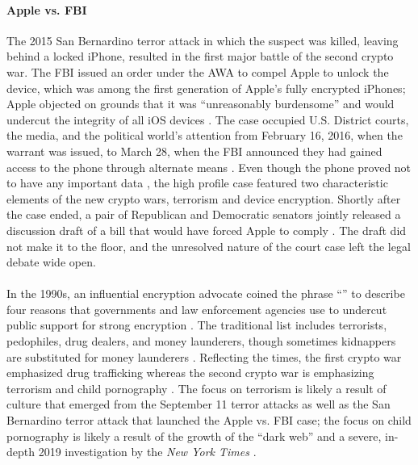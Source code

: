 \paragraph*{Apple vs. FBI} The 2015 San Bernardino terror attack in which the suspect was killed, leaving behind a
locked iPhone, resulted in the first major battle of the second crypto war. The \ac{FBI} issued an order under the
\acrlong{AWA} to compel Apple to unlock the device, which was among the first generation of Apple's fully encrypted
iPhones; Apple objected on grounds that it was ``unreasonably burdensome'' and would undercut the integrity of all iOS
devices \cite{schulze_clipper_2017}. The case occupied U.S. District courts, the media, and the political world's
attention from February 16, 2016, when the warrant was issued, to March 28, when the \ac{FBI} announced they had gained
access to the phone through alternate means \cite{novet_2016}. Even though the phone proved not to have any important
data \cite{schulze_clipper_2017}, the high profile case featured two characteristic elements of the new crypto wars,
terrorism and device encryption. Shortly after the case ended, a pair of Republican and Democratic senators jointly
released a discussion draft of a bill that would have forced Apple to comply \cite{burr_2016}. The draft did not make it
to the floor, and the unresolved nature of the court case left the legal debate wide open.

\paragraph*{} In the 1990s, an influential encryption advocate coined the phrase ``''
to describe four reasons that governments and law enforcement agencies use to undercut public support for strong
encryption \cite{may_1994}. The traditional list includes terrorists, pedophiles, drug dealers, and money launderers,
though sometimes kidnappers are substituted for money launderers \cite{schneier_scaring_2019}. Reflecting the times, the
first crypto war emphasized drug trafficking whereas the second crypto war is emphasizing terrorism and child
pornography \cite{schulze_clipper_2017}. The focus on terrorism is likely a result of culture that emerged from the
September 11 terror attacks as well as the San Bernardino terror attack that launched the Apple vs. \ac{FBI} case; the
focus on child pornography is likely a result of the growth of the ``dark web'' and a severe, in-depth 2019
investigation by the \textit{New York Times} \cite{keller_internet_2019}.

